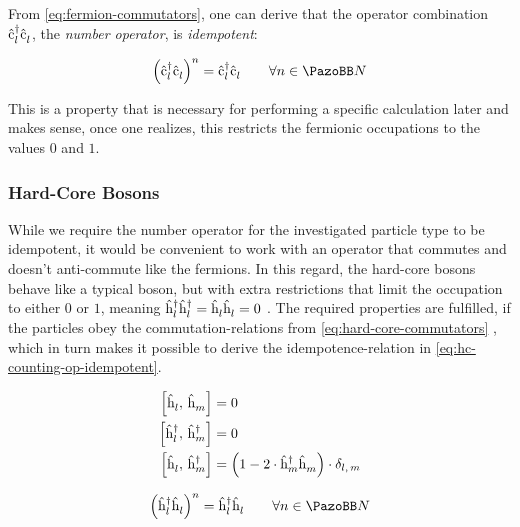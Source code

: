 From \autoref{eq:fermion-commutators}, one can derive that the operator combination $\hat{\text{c}}^{\dagger }_{l}\hat{\text{c}}^{ }_{l}$, the \emph{number operator}, is \emph{idempotent}: 

\begin{equation}
    \label{eq:fermion-counting-op-idempotent}
    \left(\cop{l}{\dagger}\cop{l}{}\right)^n = 
    \cop{l}{\dagger}\cop{l}{} \qquad \forall n \in \mathbb{N}
\end{equation}

This is a property that is necessary for performing a specific calculation later and makes sense, once one realizes, this restricts the  fermionic occupations to the values $0$ and $1$.

\subsubsection*{Hard-Core Bosons}

While we require the number operator for the investigated particle type to be idempotent, it would be convenient to work with an operator that commutes and doesn't anti-commute like the fermions. 
In this regard, the hard-core bosons behave like a typical boson, but with extra restrictions that limit the occupation to either $0$ or $1$, meaning $\hat{\text{h}}^{\dagger }_{l}\hat{\text{h}}^{\dagger }_{l} = \hat{\text{h}}^{ }_{l}\hat{\text{h}}^{ }_{l} = 0$ \cite{hardCoreBosonsBasics}.
The required properties are fulfilled, if the particles obey the commutation-relations from \autoref{eq:hard-core-commutators} \cite{hardCoreBosonsFullCommutationRelation}, which in turn makes it possible to derive the idempotence-relation in \autoref{eq:hc-counting-op-idempotent}.

\begin{equation}
    \label{eq:hard-core-commutators}
    \begin{split}
        \left[\hat{\text{h}}^{ }_{l},\,\hat{\text{h}}^{ }_{m}\right] &= 0\\
        \left[\hat{\text{h}}^{\dagger }_{l},\,\hat{\text{h}}^{\dagger }_{m}\right] &= 0\\
        \left[\hat{\text{h}}^{ }_{l},\,\hat{\text{h}}^{\dagger }_{m}\right] &= \left(1 - 2 \cdot \hat{\text{h}}^{\dagger }_{m}\hat{\text{h}}^{ }_{m} \right) \cdot \delta_{l,\,m}
    \end{split}
\end{equation}

\begin{equation}
    \label{eq:hc-counting-op-idempotent}
    \left(\hop{l}{\dagger}\hop{l}{}\right)^n = 
    \hop{l}{\dagger}\hop{l}{} \qquad \forall n \in \mathbb{N}
\end{equation}

